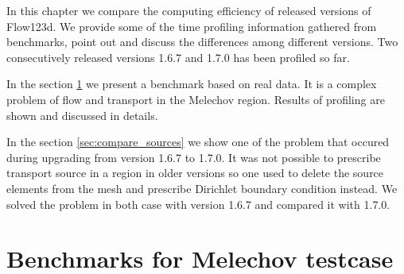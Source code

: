 %
%
%
%
%
%
%
%


In this chapter we compare the computing efficiency of released versions of Flow123d. We provide 
some of the time profiling information gathered from benchmarks, point out and discuss the differences 
among different versions. Two consecutively released versions 1.6.7 and 1.7.0 has been profiled so far.

In the section \ref{sec:compare_mel} we present a benchmark based on real data. It is a complex 
problem of flow and transport in the Melechov region. Results of profiling are shown and discussed 
in details.

In the section \ref{sec:compare_sources} we show one of the problem that occured during upgrading from
version 1.6.7 to 1.7.0. It was not possible to prescribe transport source in a region in older versions
so one used to delete the source elements from the mesh and prescribe Dirichlet boundary condition instead.
We solved the problem in both case with version 1.6.7 and compared it with 1.7.0.



\section{Benchmarks for Melechov testcase}
\label{sec:compare_mel}


